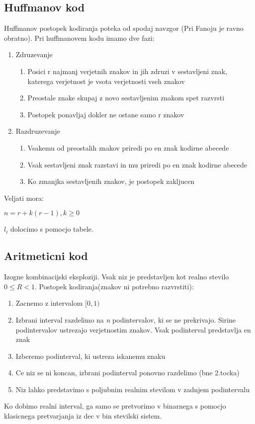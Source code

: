 \documentclass{article}
\begin{document}
\begin{multicols}{4}
\subsection{Huffmanov kod}
Huffmanov postopek kodiranja poteka od spodaj navzgor (Pri Fanoju je ravno obratno).
Pri huffmanovem kodu imamo dve fazi:
\begin{enumerate}
    \item Zdruzevanje
        \begin{enumerate}
            \item Posici r najmanj verjetnih znakov in jih zdruzi v sestavljeni znak, katerega verjetnost je vsota verjetnosti vseh znakov
            \item Preostale znake skupaj z novo sestavljenim znakom spet razvrsti
            \item Postopek ponavljaj dokler ne ostane samo r znakov
        \end{enumerate}
    \item Razdruzevanje
        \begin{enumerate}
            \item Vsakemu od preostalih znakov priredi po en znak kodirne abecede
            \item Vsak sestavljeni znak razstavi in mu priredi po en znak kodirne abecede
            \item Ko zmanjka sestavljenih znakov, je postopek zakljucen
        \end{enumerate}
\end{enumerate}
Veljati mora:
\begin{center}
    \begin{math}
        n = r + k(r-1), k \geq 0
    \end{math}
\end{center}
$l_i$ dolocimo s pomocjo tabele.

\subsection{Aritmeticni kod}
Izogne kombinacijski eksploziji.
Vsak niz je predstavljen kot realno stevilo $0 \leq R < 1$.
Postopek kodiranja(znakov ni potrebno razvrstiti):
\begin{enumerate}
    \item Zacnemo z intervalom $[0, 1)$
    \item Izbrani interval razdelimo na \textit{n} podintervalov, ki se ne prekrivajo. Sirine podintervalov ustrezajo
        verjetnostim znakov. Vsak podinterval predstavlja en znak
    \item Izberemo podinterval, ki ustreza iskanemu znaku
    \item Ce niz se ni koncan, izbrani podinterval ponovno razdelimo (bne 2.tocka)
    \item Niz lahko predstavimo s poljubnim realnim stevilom v zadnjem podintervalu
\end{enumerate}
Ko dobimo realni interval, ga samo se pretvorimo v binarnega s pomocjo klasicnega pretvarjanja
iz dec v bin stevilski sistem.


\end{multicols}
\end{document}
